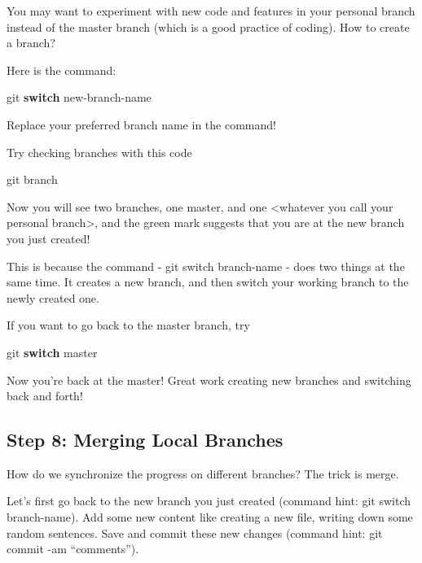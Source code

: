 \documentclass[
  letterpaper,
  DIV=11,
  numbers=noendperiod]{scrartcl}
\newenvironment{Shaded}{\begin{snugshade}}{\end{snugshade}}
\newcommand{\ControlFlowTok}[1]{\textcolor[rgb]{0.00,0.23,0.31}{\textbf{#1}}}
\newcommand{\NormalTok}[1]{\textcolor[rgb]{0.00,0.23,0.31}{#1}}
\newcommand{\SpecialCharTok}[1]{\textcolor[rgb]{0.37,0.37,0.37}{#1}}
\begin{document}
You may want to experiment with new code and features in your personal
branch instead of the master branch (which is a good practice of
coding). How to create a branch?

Here is the command:

\begin{Shaded}
\begin{Highlighting}[]
\NormalTok{git }\ControlFlowTok{switch}\NormalTok{ new}\SpecialCharTok{{-}}\NormalTok{branch}\SpecialCharTok{{-}}\NormalTok{name}
\end{Highlighting}
\end{Shaded}

Replace your preferred branch name in the command!

Try checking branches with this code

\begin{Shaded}
\begin{Highlighting}[]
\NormalTok{git branch}
\end{Highlighting}
\end{Shaded}

Now you will see two branches, one master, and one \textless whatever
you call your personal branch\textgreater, and the green mark suggests
that you are at the new branch you just created!

This is because the command - git switch branch-name - does two things
at the same time. It creates a new branch, and then switch your working
branch to the newly created one.

If you want to go back to the master branch, try

\begin{Shaded}
\begin{Highlighting}[]
\NormalTok{git }\ControlFlowTok{switch}\NormalTok{ master}
\end{Highlighting}
\end{Shaded}

Now you're back at the master! Great work creating new branches and
switching back and forth!

\subsection{Step 8: Merging Local
Branches}\label{step-8-merging-local-branches}

How do we synchronize the progress on different branches? The trick is
merge.

Let's first go back to the new branch you just created (command hint:
git switch branch-name). Add some new content like creating a new file,
writing down some random sentences. Save and commit these new changes
(command hint: git commit -am ``comments'').
\end{document}
